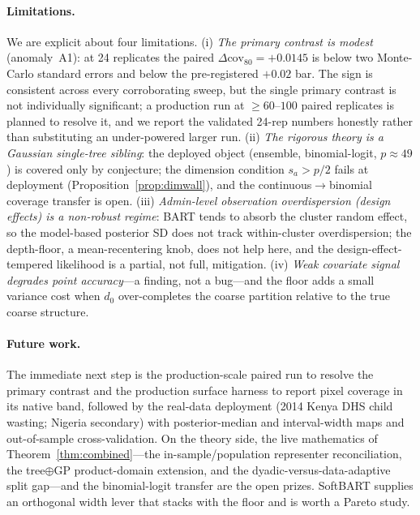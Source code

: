 \documentclass[11pt]{article}
\theoremstyle{remark}
\newcommand{\dz}{d_0}
\newcommand{\cov}{\mathrm{cov}}
\begin{document}
\paragraph{Limitations.}
We are explicit about four limitations. (i) \emph{The primary contrast is modest}
(anomaly~A1): at 24 replicates the paired $\Delta\cov_{80}=+0.0145$ is below two
Monte-Carlo standard errors and below the pre-registered $+0.02$ bar. The sign is
consistent across every corroborating sweep, but the single primary contrast is
not individually significant; a production run at $\ge60$--$100$ paired replicates
is planned to resolve it, and we report the validated 24-rep numbers honestly
rather than substituting an under-powered larger run. (ii) \emph{The rigorous
theory is a Gaussian single-tree sibling}: the deployed object (ensemble,
binomial-logit, $p\approx49$) is covered only by conjecture; the dimension
condition $s_a>p/2$ fails at deployment (Proposition~\ref{prop:dimwall}), and the
continuous$\to$binomial coverage transfer is open. (iii) \emph{Admin-level
observation overdispersion (design effects) is a non-robust regime}: BART tends to
absorb the cluster random effect, so the model-based posterior SD does not track
within-cluster overdispersion; the depth-floor, a mean-recentering knob, does not
help here, and the design-effect-tempered likelihood is a partial, not full,
mitigation. (iv) \emph{Weak covariate signal degrades point accuracy}---a finding,
not a bug---and the floor adds a small variance cost when $\dz$ over-completes the
coarse partition relative to the true coarse structure.

\paragraph{Future work.}
The immediate next step is the production-scale paired run to resolve the primary
contrast and the production surface harness to report pixel coverage in its native
band, followed by the real-data deployment (2014 Kenya DHS child wasting; Nigeria
secondary) with posterior-median and interval-width maps and out-of-sample
cross-validation. On the theory side, the live mathematics of
Theorem~\ref{thm:combined}---the in-sample/population representer reconciliation,
the tree$\oplus$GP product-domain extension, and the dyadic-versus-data-adaptive
split gap---and the binomial-logit transfer are the open prizes. SoftBART supplies
an orthogonal width lever that stacks with the floor and is worth a Pareto study.

\end{document}
